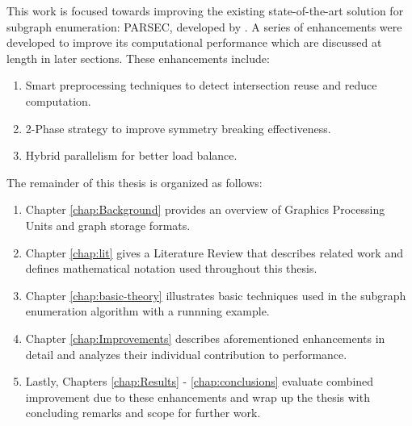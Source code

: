 This work is focused towards improving the existing state-of-the-art solution for subgraph enumeration: PARSEC, developed by \cite{PARSEC_VD}.
A series of enhancements were developed to improve its computational performance which are discussed at length in later sections. These enhancements include:
\begin{enumerate}
    \item Smart preprocessing techniques to detect intersection reuse and reduce computation.
    \item 2-Phase strategy to improve symmetry breaking effectiveness.
    \item Hybrid parallelism for better load balance.
\end{enumerate}
The remainder of this thesis is organized as follows:
\begin{enumerate}[\indent {}]
    \item Chapter \ref{chap:Background} provides an overview of Graphics Processing Units and graph storage formats.
    \item Chapter \ref{chap:lit} gives a Literature Review that describes related work and defines mathematical notation used throughout this thesis.
    \item Chapter \ref{chap:basic-theory} illustrates basic techniques used in the subgraph enumeration algorithm with a runnning example.
    \item Chapter \ref{chap:Improvements} describes aforementioned enhancements in detail and analyzes their individual contribution to performance.
    \item Lastly, Chapters \ref{chap:Results} - \ref{chap:conclusions} evaluate combined improvement due to these enhancements and wrap up the thesis with concluding remarks and scope for further work.
\end{enumerate}


